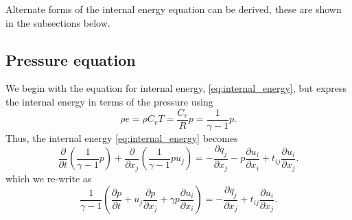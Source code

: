 \documentclass[oneside,a4paper,11pt]{report}
\begin{document}
Alternate forms of the internal energy equation can be derived, these are shown in the subsections below.
\subsection{Pressure equation} 
We begin with the equation for internal energy, \cref{eq:internal_energy}, but express the internal energy in terms of the pressure using 
\begin{equation}
\rho e = \rho C_v T = \frac{C_v}{R} p = \frac{1}{\gamma - 1} p.
\end{equation}
Thus, the internal energy \cref{eq:internal_energy} becomes
\begin{equation}
\frac{ \partial}{\partial t} \left ( \frac{1}{\gamma - 1} p \right ) + \frac{\partial}{\partial x_j} \left ( \frac{1}{\gamma - 1} p u_j \right ) = -\frac{\partial q_j}{\partial x_j} - p \frac{\partial u_i}{\partial x_i} + t_{ij} \frac{\partial u_i}{\partial x_j}.
\end{equation}
which we re-write as
\begin{equation}
\label{eq:energy_form_pressure}
\frac{1}{\gamma - 1} \left ( \frac{ \partial p}{\partial t}  + u_j\frac{\partial p}{\partial x_j} + \gamma p \frac{\partial u_i}{\partial x_i} \right ) = -\frac{\partial q_j}{\partial x_j} + t_{ij} \frac{\partial u_i}{\partial x_j}.
\end{equation}
\end{document}
